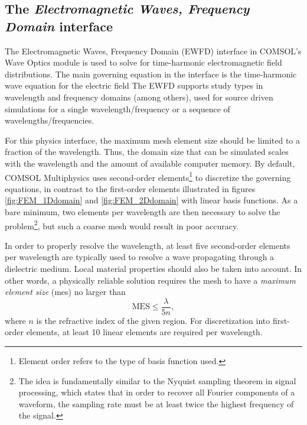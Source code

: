 \subsection{The \emph{Electromagnetic Waves, Frequency Domain} interface}
\label{sec:COMSOL_ewfd}
The Electromagnetic Waves, Frequency Domain (EWFD) interface in COMSOL's Wave Optics module is used to solve for time-harmonic electromagnetic field distributions. The main governing equation in the interface is the time-harmonic wave equation for the electric field  The EWFD supports study types in wavelength and frequency domains (among others\cite{comsol_waveopticsmodule}), used for source driven simulations for a single wavelength/frequency or a sequence of wavelengths/frequencies.

For this physics interface, the maximum mesh element size should be limited to a fraction of the wavelength. Thus, the domain size that can be simulated scales with the wavelength and the amount of available computer memory. By default, COMSOL Multiphysics uses second-order elements\footnote{Element order refers to the type of basis function used.} to discretize the governing equations\cite{comsol_ElementOrder}, in contrast to the first-order elements illustrated in figures \ref{fig:FEM_1Ddomain} and \ref{fig:FEM_2Ddomain} with linear basis functions. As a bare minimum, two elements per wavelength are then necessary to solve the problem\footnote{The idea is fundamentally similar to the Nyquist sampling theorem in signal processing, which states that in order to recover all Fourier components of a waveform, the sampling rate must be at least twice the highest frequency of the signal.}, but such a coarse mesh would result in poor accuracy. 

In order to properly resolve the wavelength, at least five second-order elements per wavelength are typically used to resolve a wave propagating through a dielectric medium\cite{comsol_simulationToolsEM}. Local material properties should also be taken into account. In other words, a physically reliable solution requires the mesh to have a \emph{maximum element size} (\ac{mes}) no larger than
\begin{equation}
    \text{MES} \leq \frac{\lambda}{5n},
    \label{eq:MES<=lambda/5n}
\end{equation}
where $n$ is the refractive index of the given region. For discretization into first-order elements, at least 10 linear elements are required per wavelength\cite{comsol_waveopticsmodule}.

